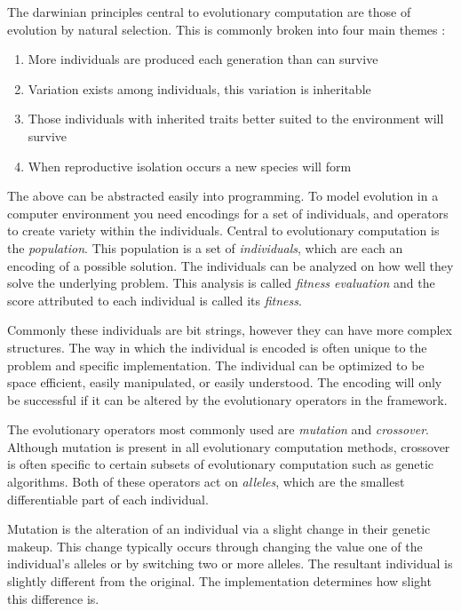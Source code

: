 \documentclass[10pt,letterpaper]{article}
\begin{document}
The darwinian principles central to evolutionary computation are those of evolution by natural selection. This is commonly broken into four main themes \cite{naturalselection,naturalselection2}:
\begin{enumerate}
\item More individuals are produced each generation than can survive
\item Variation exists among individuals, this variation is inheritable
\item Those individuals with inherited traits better suited to the environment will survive
\item When reproductive isolation occurs a new species will form
\end{enumerate}

The above can be abstracted easily into programming. To model evolution in a computer environment you need encodings for a set of individuals, and operators to create variety within the individuals. Central to evolutionary computation is the \textit{population}. This population is a set of \textit{individuals}, which are each an encoding of a possible solution. The individuals can be analyzed on how well they solve the underlying problem. This analysis is called \textit{fitness evaluation} and the score attributed to each individual is called its \textit{fitness}.

Commonly these individuals are bit strings, however they can have more complex structures. The way in which the individual is encoded is often unique to the problem and specific implementation. The individual can be optimized to be space efficient, easily manipulated, or easily understood. The encoding will only be successful if it can be altered by the evolutionary operators in the framework.

The evolutionary operators most commonly used are \textit{mutation} and \textit{crossover}. Although mutation is present in all evolutionary computation methods, crossover is often specific to certain subsets of evolutionary computation such as genetic algorithms. Both of these operators act on \textit{alleles}, which are the smallest differentiable part of each individual. %

Mutation is the alteration of an individual via a slight change in their genetic makeup. This change typically occurs through changing the value one of the individual's alleles or by switching two or more alleles. The resultant individual is slightly different from the original. The implementation determines how slight this difference is.
\end{document}

